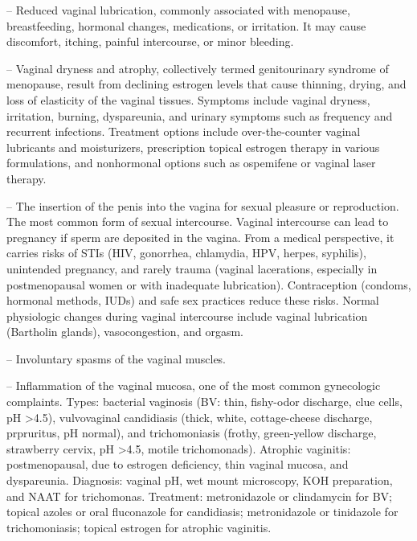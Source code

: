 -- Reduced vaginal lubrication, commonly associated with menopause, breastfeeding, hormonal changes, medications, or irritation. It may cause discomfort, itching, painful intercourse, or minor bleeding.

-- Vaginal dryness and atrophy, collectively termed genitourinary syndrome of menopause, result from declining estrogen levels that cause thinning, drying, and loss of elasticity of the vaginal tissues. Symptoms include vaginal dryness, irritation, burning, dyspareunia, and urinary symptoms such as frequency and recurrent infections. Treatment options include over-the-counter vaginal lubricants and moisturizers, prescription topical estrogen therapy in various formulations, and nonhormonal options such as ospemifene or vaginal laser therapy.

-- The insertion of the penis into the vagina for sexual pleasure or reproduction. The most common form of sexual intercourse. Vaginal intercourse can lead to pregnancy if sperm are deposited in the vagina. From a medical perspective, it carries risks of STIs (HIV, gonorrhea, chlamydia, HPV, herpes, syphilis), unintended pregnancy, and rarely trauma (vaginal lacerations, especially in postmenopausal women or with inadequate lubrication). Contraception (condoms, hormonal methods, IUDs) and safe sex practices reduce these risks. Normal physiologic changes during vaginal intercourse include vaginal lubrication (Bartholin glands), vasocongestion, and orgasm.


-- Involuntary spasms of the vaginal muscles.

-- Inflammation of the vaginal mucosa, one of the most common gynecologic complaints. Types: bacterial vaginosis (BV: thin, fishy-odor discharge, clue cells, pH >4.5), vulvovaginal candidiasis (thick, white, cottage-cheese discharge, prpruritus, pH normal), and trichomoniasis (frothy, green-yellow discharge, strawberry cervix, pH >4.5, motile trichomonads). Atrophic vaginitis: postmenopausal, due to estrogen deficiency, thin vaginal mucosa, and dyspareunia. Diagnosis: vaginal pH, wet mount microscopy, KOH preparation, and NAAT for trichomonas. Treatment: metronidazole or clindamycin for BV; topical azoles or oral fluconazole for candidiasis; metronidazole or tinidazole for trichomoniasis; topical estrogen for atrophic vaginitis.

